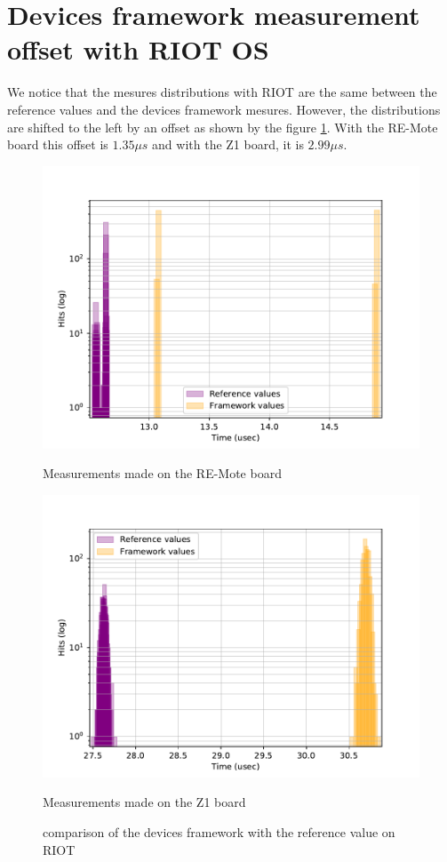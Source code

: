 \section{Devices framework measurement offset with RIOT OS}

We notice that the mesures distributions with RIOT are the same between the reference values and the devices framework mesures.
However, the distributions are shifted to the left by an offset as shown by the figure \ref{fig:devices-comparison-riot}.
With the RE-Mote board this offset is $1.35 \mu s$ and with the Z1 board, it is $2.99 \mu s$.

\begin{figure}[!ht]
  \centering
  \includegraphics[scale=.7]{assets/comparison-devices-framework-riot-remote.pdf}
  \caption*{Measurements made on the RE-Mote board}

  \centering
  \includegraphics[scale=.7]{assets/comparison-devices-framework-riot-z1.pdf}
  \caption*{Measurements made on the Z1 board}
  \caption{comparison of the devices framework with the reference value on RIOT\label{fig:devices-comparison-riot}}
\end{figure}


